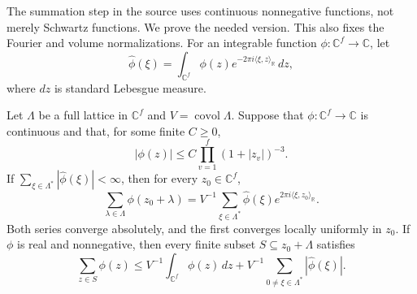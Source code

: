 The summation step in the source uses continuous nonnegative
functions, not merely Schwartz functions.  We prove the needed
version.  This also fixes the Fourier and volume normalizations.
For an integrable function $\phi:\mathbb C^f\to\mathbb C$, let
\[
 \widehat\phi(\xi)=\int_{\mathbb C^f}\phi(z)
          e^{-2\pi i\langle\xi,z\rangle_{\mathbb R}}\,dz,
\]
where $dz$ is standard Lebesgue measure.

\begin{theorem}\label{gt-Poisson}
Let $\Lambda$ be a full lattice in $\mathbb C^f$ and
$V=\operatorname{covol}\Lambda$.
Suppose that $\phi:\mathbb C^f\to\mathbb C$ is continuous and
that, for some finite $C\geq0$,
\begin{equation}\label{gt-Poisson-decay}
 |\phi(z)|\leq C\prod_{v=1}^f(1+|z_v|)^{-3}.
\end{equation}
If $\sum_{\xi\in\Lambda^*}|\widehat\phi(\xi)|<\infty$, then
for every $z_0\in\mathbb C^f$,
\begin{equation}\label{gt-Poisson-eq}
 \sum_{\lambda\in\Lambda}\phi(z_0+\lambda)
       =V^{-1}\sum_{\xi\in\Lambda^*}
          \widehat\phi(\xi)
                 e^{2\pi i\langle\xi,z_0\rangle_{\mathbb R}}.
\end{equation}
Both series converge absolutely, and the first converges locally
uniformly in $z_0$.
If $\phi$ is real and nonnegative, then every finite subset
$S\subseteq z_0+\Lambda$ satisfies
\begin{equation}\label{gt-Poisson-inequality}
 \sum_{z\in S}\phi(z)
       \leq V^{-1}\int_{\mathbb C^f}\phi(z)\,dz
          +V^{-1}\sum_{0\ne\xi\in\Lambda^*}
                                  |\widehat\phi(\xi)|.
\end{equation}
\end{theorem}

